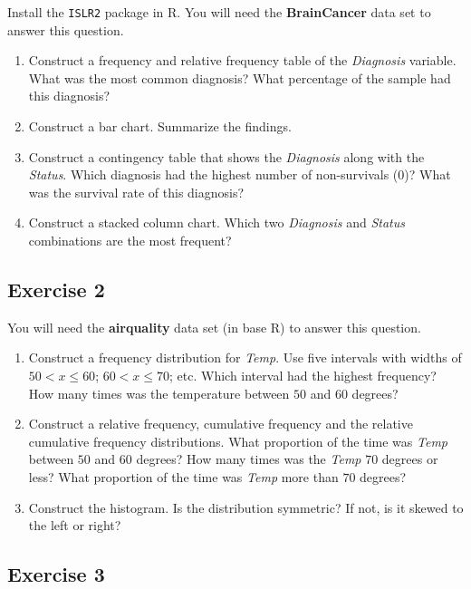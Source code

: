 \documentclass[
  letterpaper,
  DIV=11,
  numbers=noendperiod]{scrreprt}
\providecommand{\tightlist}{%
  \setlength{\itemsep}{0pt}\setlength{\parskip}{0pt}}\usepackage{longtable,booktabs,array}
\begin{document}
Install the \texttt{ISLR2} package in R. You will need the
\textbf{BrainCancer} data set to answer this question.

\begin{enumerate}
\def\labelenumi{\arabic{enumi}.}
\tightlist
\item
  Construct a frequency and relative frequency table of the
  \emph{Diagnosis} variable. What was the most common diagnosis? What
  percentage of the sample had this diagnosis?
\item
  Construct a bar chart. Summarize the findings.
\item
  Construct a contingency table that shows the \emph{Diagnosis} along
  with the \emph{Status}. Which diagnosis had the highest number of
  non-survivals (0)? What was the survival rate of this diagnosis?
\item
  Construct a stacked column chart. Which two \emph{Diagnosis} and
  \emph{Status} combinations are the most frequent?
\end{enumerate}

\hypertarget{exercise-2-2}{%
\subsection*{Exercise 2}\label{exercise-2-2}}

You will need the \textbf{airquality} data set (in base R) to answer
this question.

\begin{enumerate}
\def\labelenumi{\arabic{enumi}.}
\tightlist
\item
  Construct a frequency distribution for \emph{Temp}. Use five intervals
  with widths of \(50<x\le60\); \(60<x\le70\); etc. Which interval had
  the highest frequency? How many times was the temperature between
  \(50\) and \(60\) degrees?
\item
  Construct a relative frequency, cumulative frequency and the relative
  cumulative frequency distributions. What proportion of the time was
  \emph{Temp} between \(50\) and \(60\) degrees? How many times was the
  \emph{Temp} \(70\) degrees or less? What proportion of the time was
  \emph{Temp} more than \(70\) degrees?
\item
  Construct the histogram. Is the distribution symmetric? If not, is it
  skewed to the left or right?
\end{enumerate}

\hypertarget{exercise-3-2}{%
\subsection*{Exercise 3}\label{exercise-3-2}}
\end{document}
